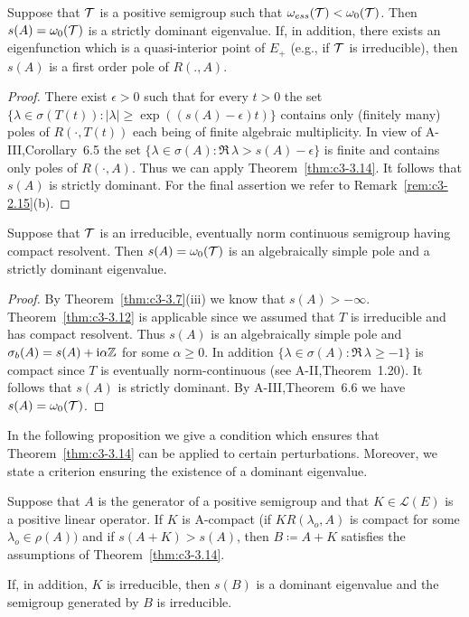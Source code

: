 \begin{corollary}\label{cor:c3-3.16}
	Suppose that $\mathcal{T}$ is a positive semigroup such that $\omega_{ess}(\mathcal{T}) < \omega_0(\mathcal{T})$. 
	Then $s(A) = \omega_0(\mathcal{T})$ is a strictly dominant eigenvalue.
	If, in addition, there exists an eigenfunction which is a quasi-interior point of $E_{+}$ (e.g., if $\mathcal{T}$ is irreducible), then $s(A)$ is a first order pole of $R(.,A)$.
\end{corollary}

\begin{proof}
	There exist $\epsilon > 0$ such that for every $t > 0$ the set $\{\lambda \in \sigma(T(t)) : |\lambda| \geq \exp((s(A)-\epsilon)t)\}$ contains only (finitely many) poles of $R(\cdot,T(t))$ each being of finite algebraic multiplicity. 
	In view of A-III,Corollary~6.5 the set $\{\lambda \in \sigma(A) : \Re\,\lambda > s(A)-\epsilon\}$ is finite and contains only poles of $R(\cdot,A)$. 
	Thus we can apply Theorem~\ref{thm:c3-3.14}. 
	It follows that $s(A)$ is strictly dominant.
	For the final assertion we refer to Remark~\ref{rem:c3-2.15}(b).
\end{proof}

\begin{corollary}\label{cor:c3-3.17}
	Suppose that $\mathcal{T}$ is an irreducible, eventually norm continuous semigroup having compact resolvent.
	Then $s(A) = \omega_0(\mathcal{T})$ is an algebraically simple pole and a strictly dominant eigenvalue.
\end{corollary}

\begin{proof}
	By Theorem~\ref{thm:c3-3.7}(iii) we know that $s(A) > -\infty$. 
	Theorem~\ref{thm:c3-3.12} is applicable since we assumed that $T$ is irreducible and has compact resolvent.
	Thus $s(A)$ is an algebraically simple pole and $\sigma_{b}(A) = s(A) + \mathrm{i}\alpha\mathbb{Z}$ for some $\alpha \geq 0$. 
	In addition $\{\lambda \in \sigma(A) : \Re\,\lambda \geq -1\}$ is compact since $T$ is eventually norm-continuous (see A-II,Theorem~1.20). 
	It follows that $s(A)$ is strictly dominant.
	By A-III,Theorem~6.6 we have $s(A) = \omega_0(\mathcal{T})$.
\end{proof}

In the following proposition we give a condition which ensures that Theorem~\ref{thm:c3-3.14} can be applied to certain perturbations. 
Moreover, we state a criterion ensuring the existence of a dominant eigenvalue.
%
%
\begin{proposition}\label{prop:c3-3.18}
	Suppose that $A$ is the generator of a positive semigroup and that $K \in \mathcal{L}(E)$ is a positive linear operator.
	If $K$ is A-compact (\ie  if $KR(\lambda_{o},A)$ is compact for some $\lambda_{o} \in \rho(A))$ and if $s(A+K) > s(A)$, then $B \coloneqq  A + K$ satisfies the assumptions of Theorem~\ref{thm:c3-3.14}.
	
	If, in addition, $K$ is irreducible, then $s(B)$ is a dominant eigenvalue and the semigroup generated by $B$ is irreducible.
\end{proposition}

